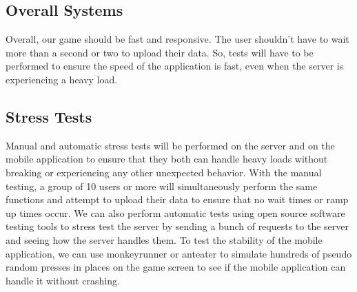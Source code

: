 \documentclass[a4wide]{article}
\begin{document}
\subsection{Overall Systems}
\-Overall, our game should be fast and responsive. The user shouldn't have to wait more than a second or two to upload their data. So, tests will have to be performed to ensure the speed of the application is fast, even when the server is experiencing a heavy load.
\subsection{Stress Tests}
\-Manual and automatic stress tests will be performed on the server and on the mobile application to ensure that they both can handle heavy loads without breaking or experiencing any other unexpected behavior. With the manual testing, a group of 10 users or more will simultaneously perform the same functions and attempt to upload their data to ensure that no wait times or ramp up times occur. We can also perform automatic tests using open source software testing tools to stress test the server by sending a bunch of requests to the server and seeing how the server handles them. To test the stability of the mobile application, we can use monkeyrunner or anteater to simulate hundreds of pseudo random presses in places on the game screen to see if the mobile application can handle it without crashing.


\end{document}
